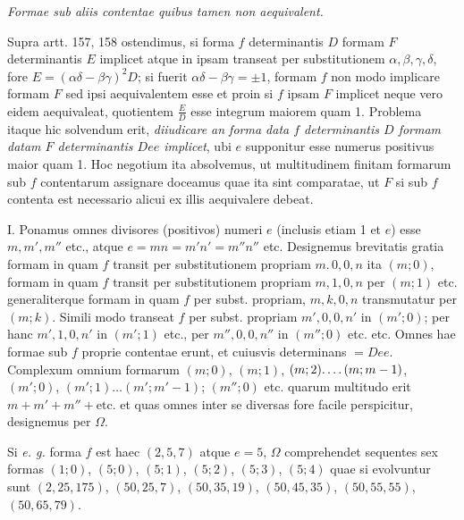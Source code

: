 \begin{center}
\textit{Formae sub aliis contentae quibus tamen non aequivalent.}
\end{center}

Supra artt. 157, 158 ostendimus, si forma $f$ determinantis $D$ formam $F$ determinantis $E$ implicet atque in ipsam transeat per substitutionem $\alpha,\beta,\gamma,\delta$, fore $E=(\alpha\delta-\beta\gamma)^2D$; si fuerit $\alpha\delta-\beta\gamma=\pm1$, formam $f$ non modo implicare formam $F$ sed ipsi aequivalentem esse et proin si $f$ ipsam $F$ implicet neque vero eidem aequivaleat, quotientem $\frac{E}{D}$ esse integrum maiorem quam 1. Problema itaque hic solvendum erit, \textit{diiudicare an forma data $f$ determinantis $D$ formam datam $F$ determinantis $Dee$ implicet}, ubi $e$ supponitur esse numerus positivus maior quam 1. Hoc negotium ita absolvemus, ut multitudinem finitam formarum sub $f$ contentarum assignare doceamus quae ita sint comparatae, ut $F$ si sub $f$ contenta est necessario alicui ex illis aequivalere debeat.

I. Ponamus omnes divisores (positivos) numeri $e$ (inclusis etiam 1 et $e$) esse $m,m',m''$ etc., atque $e=mn=m'n'=m''n''$ etc. Designemus brevitatis gratia formam in quam $f$ transit per substitutionem propriam $m.\,0,0,n$ ita $(m;0)$, formam in quam $f$ transit per substitutionem propriam $m,1,0,n$ per $(m;1)$ etc. generaliterque formam in quam $f$ per subst. propriam, $m,k,0,n$ transmutatur per $(m;k)$. Simili modo transeat $f$ per subst. propriam $m',0,0,n'$ in $(m';0)$; per hanc $m',1,0,n'$ in $(m';1)$ etc., per $m'',0,0,n''$ in $(m'';0)$ etc. etc. Omnes hae formae sub $f$ proprie contentae erunt, et cuiusvis determinans $=Dee$. Complexum omnium formarum $(m;0)$, $(m;1)$, $(m;2)\ldotp\ldotp\ldotp\ldotp(m;m-1)$, $(m';0)$, $(m';1)\ldots(m';m'-1)$; $(m'';0)$ etc. quarum multitudo erit $m+m'+m''+\text{etc.}$ et quas omnes inter se diversas fore facile perspicitur, designemus per $\Omega$.

Si \textit{e. g.} forma $f$ est haec $(2,5,7)$ atque $e=5$, $\Omega$ comprehendet sequentes sex formas $(1;0)$, $(5;0)$, $(5;1)$, $(5;2)$, $(5;3)$, $(5;4)$ quae si evolvuntur sunt $(2,25,175)$, $(50,25,7)$, $(50,35,19)$, $(50,45,35)$, $(50,55,55)$, $(50,65,79)$.

